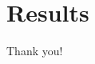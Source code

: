 \documentclass[serif]{beamer}  %
\begin{document}
\section{Results}

\begin{frame}
\centering
{\Huge Thank you!}
\end{frame}



\end{document}
